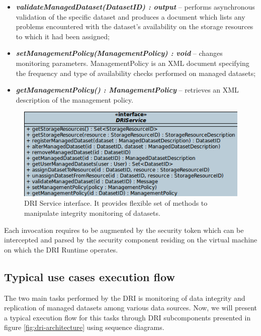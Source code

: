 \begin{itemize}
	\item \textbf{\textit{validateManagedDataset(DatasetID) : output}} --
	performs asynchronous validation of the specific dataset and produces a
	document which lists any problems encountered with the dataset's
	availability on the storage resources to which it had been assigned;
	
	\item \textbf{\textit{setManagementPolicy(ManagementPolicy) : void}} --
	changes monitoring parameters. ManagementPolicy is an XML document
	specifying the frequency and type of availability checks performed on
	managed datasets;
	
	\item \textbf{\textit{getManagementPolicy() : ManagementPolicy}} --
	retrieves an XML description of the management policy.
\end{itemize}

\begin{figure}[h!]
	\centering
	\includegraphics[width=\textwidth]{images/dri-interface.png}
	\caption{DRI Service interface. It provides flexible set of methods to
	manipulate integrity monitoring of datasets.}
	\label{fig:dri-interface}
\end{figure}

Each invocation requires to be augmented by the security token which can be
intercepted and parsed by the security component residing on the virtual
machine on which the DRI Runtime operates.

		\subsection{Typical use cases execution flow}
The two main tasks performed by the DRI is monitoring of data integrity and
replication of managed datasets among various data sources. Now, we will
present a typical execution flow for this tasks through DRI subcomponents
presented in figure \ref{fig:dri-architecture} using sequence diagrams.\\

